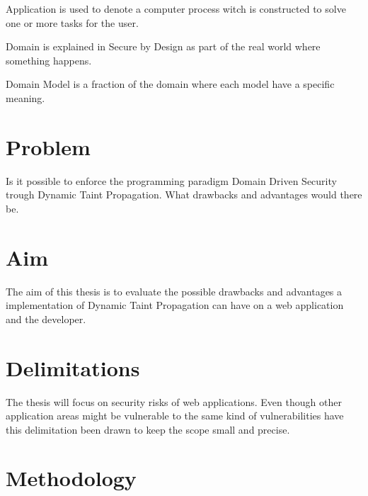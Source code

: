 \begin{definition}{Application} 
	is used to denote a computer process witch is constructed to solve one or more tasks for the user.
\end{definition}

\begin{definition}{Domain}
	is explained in Secure by Design \parencite{sbd2018} as part of the real world where something happens.
\end{definition}

\begin{definition}{Domain Model}
	is a fraction of the domain where each model have a specific meaning.
\end{definition}


\section{Problem}
Is it possible to enforce the programming paradigm Domain Driven Security trough Dynamic Taint Propagation. What drawbacks and advantages would there be.  


\section{Aim}
The aim of this thesis is to evaluate the possible drawbacks and advantages a implementation of Dynamic Taint Propagation can have on a web application and the developer.


\section{Delimitations}
The thesis will focus on security risks of web applications. Even though other application areas might be vulnerable to the same kind of vulnerabilities have this delimitation been drawn to keep the scope small and precise.


\section{Methodology}
